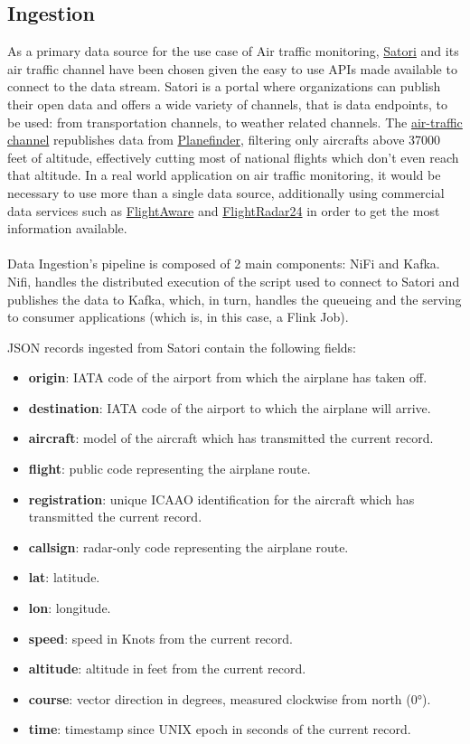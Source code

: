 \subsection{Ingestion}

As a primary data source for the use case of Air traffic monitoring, \href{https://www.satori.com/}{Satori} and its air traffic channel have been chosen given the easy to use APIs made available to connect to the data stream. Satori is a portal where organizations can publish their open data and offers a wide variety of channels, that is data endpoints, to be used: from transportation channels, to weather related channels. The \href{https://www.satori.com/channels/air-traffic}{air-traffic channel} republishes data from \href{https://planefinder.net/}{Planefinder}, filtering only aircrafts above 37000 feet of altitude, effectively cutting most of national flights which don't even reach that altitude. In a real world application on air traffic monitoring, it would be necessary to use more than a single data source, additionally using commercial data services such as \href{http://flightaware.com/}{FlightAware} and \href{http://flightradar24.com/}{FlightRadar24} in order to get the most information available.
\\\\
Data Ingestion's pipeline is composed of 2 main components: NiFi and Kafka. Nifi, handles the distributed execution of the script used to connect to Satori and publishes the data to Kafka, which, in turn, handles the queueing and the serving to consumer applications (which is, in this case, a Flink Job).

JSON records ingested from Satori contain the following fields:

\begin{itemize}
    \item \textbf{origin}: IATA code of the airport from which the airplane has taken off.
    \item \textbf{destination}: IATA code of the airport to which the airplane will arrive.
    \item \textbf{aircraft}: model of the aircraft which has transmitted the current record.
    \item \textbf{flight}: public code representing the airplane route.
    \item \textbf{registration}: unique ICAAO identification for the aircraft which has transmitted the current record.
    \item \textbf{callsign}: radar-only code representing the airplane route.
    \item \textbf{lat}: latitude.
    \item \textbf{lon}: longitude.
    \item \textbf{speed}: speed in Knots from the current record.
    \item \textbf{altitude}: altitude in feet from the current record.
    \item \textbf{course}: vector direction in degrees, measured clockwise from north (0°).
    \item \textbf{time}: timestamp since UNIX epoch in seconds of the current record.
\end{itemize}

